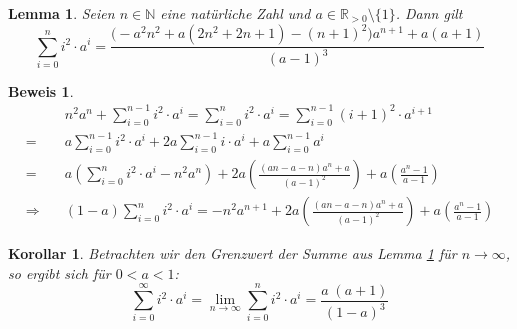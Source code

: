 \documentclass[a4paper]{article}
\newtheorem{korollar}[satz]{Korollar}
\newtheorem{lemma}[satz]{Lemma}
\theoremstyle{nonumberplain}
\newtheorem{beweis}{Beweis}
\begin{document}
\begin{lemma} \label{lem-infqsum}
	Seien $n \in \mathbb{N}$ eine natürliche Zahl und $a \in \mathbb{R}_{>0}\setminus\{1\}$. Dann gilt
	\begin{equation}
	\sum_{i=0}^{n}{i^2\cdot a^i} = \frac{\big(-a^2n^2 + a(2n^2 + 2n + 1) - (n+1)^2\big)a^{n+1}+a(a+1)}{(a-1)^3}
	\end{equation}
\end{lemma}
\begin{beweis}
	\begin{align*}
		 & n^2a^n + \sum_{i=0}^{n-1}{i^2\cdot a^i} = \sum_{i=0}^{n}{i^2\cdot a^i} = \sum_{i=0}^{n-1}{(i+1)^2\cdot a^{i+1}} \\
		=& a \sum_{i=0}^{n-1}{i^2\cdot a^{i}} + 2a \sum_{i=0}^{n-1}{i\cdot a^{i}} + a \sum_{i=0}^{n-1}{ a^{i}} \\
		=& a \left(\sum_{i=0}^{n}{i^2\cdot a^i} - n^2a^n \right) + 2a \left(\frac{(an-a-n)a^{n}+a}{(a-1)^2} \right) + a \left( \frac{a^{n}-1}{a-1} \right) \\
		\Rightarrow \quad & (1-a) \sum_{i=0}^{n}{i^2\cdot a^i} = -n^2a^{n+1} + 2a \left(\frac{(an-a-n)a^{n}+a}{(a-1)^2} \right) + a \left( \frac{a^{n}-1}{a-1} \right)
	\end{align*}
\end{beweis}
\begin{korollar} \label{kor-infqsum}
Betrachten wir den Grenzwert der Summe aus Lemma \ref{lem-infqsum} für $n \to \infty$, so ergibt sich für $0<a<1$:
\begin{equation}
\sum_{i=0}^{\infty}{i^2\cdot a^i}
= \lim\limits_{n \to \infty} \sum_{i=0}^{n}{i^2\cdot a^i}
= \frac{a\;(a+1)}{(1-a)^3}
\end{equation}	
\end{korollar}

\printbibliography
\end{document}
